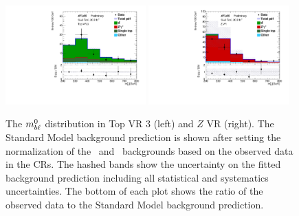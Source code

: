 \begin{figure}
  \centering
  \includegraphics[width=0.48\textwidth]{figs/blstop/vr_top_3_mbl_0.pdf}
  \includegraphics[width=0.48\textwidth]{figs/blstop/vr_Z_mbl_0.pdf}
  \caption{The $m_{b\ell}^0$ distribution in Top VR 3 (left) and $Z$ VR (right).
    The Standard Model background prediction is shown after setting the
    normalization of the \TTBAR\ and \ZGAMMAJETS\ backgrounds based on the
    observed data in the CRs. The hashed bands show the uncertainty on the
    fitted background prediction including all statistical and systematics
    uncertainties.
    The bottom of each plot shows the ratio of the observed data to the
    Standard Model background prediction.
  }
  \label{fig:mbl_vr}
\end{figure}

